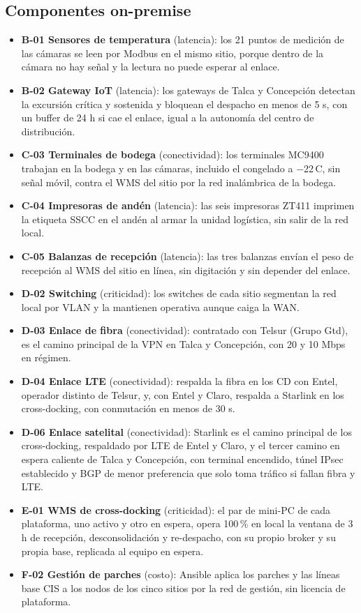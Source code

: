 \subsection*{Componentes on-premise}
\label{anx:X-local}
\begin{itemize}
  \item \textbf{B-01 Sensores de temperatura} (latencia): los 21 puntos de medición de las cámaras se leen por Modbus en el mismo sitio, porque dentro de la cámara no hay señal y la lectura no puede esperar al enlace.
  \item \textbf{B-02 Gateway IoT} (latencia): los gateways de Talca y Concepción detectan la excursión crítica y sostenida y bloquean el despacho en menos de 5 s, con un buffer de 24 h si cae el enlace, igual a la autonomía del centro de distribución.
  \item \textbf{C-03 Terminales de bodega} (conectividad): los terminales MC9400 trabajan en la bodega y en las cámaras, incluido el congelado a $-$22\,\textdegree{}C, sin señal móvil, contra el WMS del sitio por la red inalámbrica de la bodega.
  \item \textbf{C-04 Impresoras de andén} (latencia): las seis impresoras ZT411 imprimen la etiqueta SSCC en el andén al armar la unidad logística, sin salir de la red local.
  \item \textbf{C-05 Balanzas de recepción} (latencia): las tres balanzas envían el peso de recepción al WMS del sitio en línea, sin digitación y sin depender del enlace.
  \item \textbf{D-02 Switching} (criticidad): los switches de cada sitio segmentan la red local por VLAN y la mantienen operativa aunque caiga la WAN.
  \item \textbf{D-03 Enlace de fibra} (conectividad): contratado con Telsur (Grupo Gtd), es el camino principal de la VPN en Talca y Concepción, con 20 y 10 Mbps en régimen.
  \item \textbf{D-04 Enlace LTE} (conectividad): respalda la fibra en los CD con Entel, operador distinto de Telsur, y, con Entel y Claro, respalda a Starlink en los cross-docking, con conmutación en menos de 30 s.
  \item \textbf{D-06 Enlace satelital} (conectividad): Starlink es el camino principal de los cross-docking, respaldado por LTE de Entel y Claro, y el tercer camino en espera caliente de Talca y Concepción, con terminal encendido, túnel IPsec establecido y BGP de menor preferencia que solo toma tráfico si fallan fibra y LTE.
  \item \textbf{E-01 WMS de cross-docking} (criticidad): el par de mini-PC de cada plataforma, uno activo y otro en espera, opera 100\,\% en local la ventana de 3 h de recepción, desconsolidación y re-despacho, con su propio broker y su propia base, replicada al equipo en espera.
  \item \textbf{F-02 Gestión de parches} (costo): Ansible aplica los parches y las líneas base CIS a los nodos de los cinco sitios por la red de gestión, sin licencia de plataforma.
\end{itemize}

